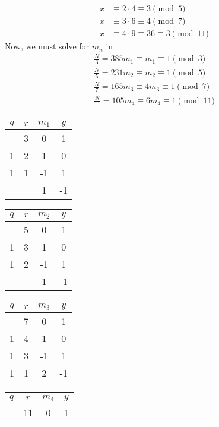 \documentclass{article}
\begin{document}
\begin{solution}{}{}
\begin{align*}
        x &\equiv 2\cdot4 \equiv 3 \pmod{5} \\
        x &\equiv 3\cdot6 \equiv 4 \pmod{7} \\
        x &\equiv 4\cdot9 \equiv 36 \equiv 3 \pmod{11}
    \end{align*}
    Now, we must solve for $m_n$ in
    \begin{align*}
        \frac{N}{3} = 385m_1 \equiv m_1 \equiv 1 \pmod{3}\\
        \frac{N}{5} = 231m_2 \equiv m_2 \equiv 1 \pmod{5} \\
        \frac{N}{7} = 165m_3 \equiv 4m_3 \equiv 1 \pmod{7} \\
        \frac{N}{11} = 105m_4 \equiv 6m_4 \equiv 1 \pmod{11}
    \end{align*}
    \begin{center}
        \begin{tabular}{c c c c}
            $q$ & $r$ & $m_1$ & $y$ \\
            \hline
            & 3 & 0 & 1 \\
            1 & 2 & 1 & 0 \\
            1 & 1 & -1 & 1 \\
            & & 1 & -1 \\
        \end{tabular}
        \quad
        \begin{tabular}{c c c c}
            $q$ & $r$ & $m_2$ & $y$ \\
            \hline
            & 5 & 0 & 1 \\
            1 & 3 & 1 & 0 \\
            1 & 2 & -1 & 1 \\
            & & 1 & -1 \\
        \end{tabular}
        \quad
        \begin{tabular}{c c c c}
            $q$ & $r$ & $m_3$ & $y$ \\
            \hline
            & 7 & 0 & 1 \\
            1 & 4 & 1 & 0 \\
            1 & 3 & -1 & 1 \\
            1 & 1 & 2 & -1 \\
        \end{tabular}
        \quad
        \begin{tabular}{c c c c}
            $q$ & $r$ & $m_4$ & $y$ \\
            \hline
            & 11 & 0 & 1 \\

\end{tabular}
\end{center}
\end{solution}
\end{document}
